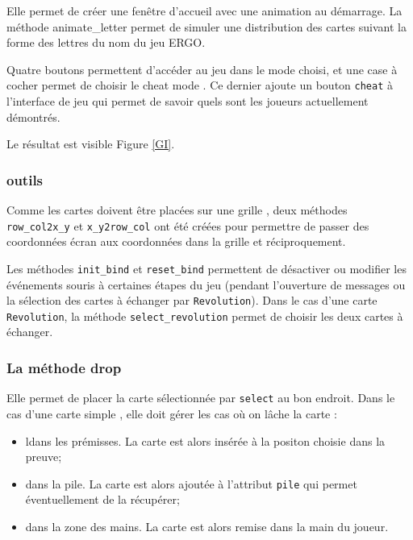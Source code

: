 \documentclass[12pt, a4paper]{article}
\begin{document}
Elle permet de créer une fenêtre d’accueil avec une animation au démarrage. La méthode animate\_letter permet de simuler une distribution des cartes suivant la forme des lettres du nom du jeu ERGO.

Quatre boutons permettent d'accéder au jeu dans le mode choisi, et une case à cocher permet de choisir le \og cheat mode \fg. Ce dernier ajoute un bouton \texttt{cheat} à l'interface de jeu qui permet de savoir quels sont les joueurs actuellement démontrés.

Le résultat est visible Figure \ref{GI}.

\subsubsection{outils}

Comme les cartes doivent être placées sur une \og grille \fg{},  deux méthodes \texttt{row\_col2x\_y} et \texttt{x\_y2row\_col} ont été créées pour permettre de passer des coordonnées écran aux coordonnées dans la grille et réciproquement.

Les méthodes \texttt{init\_bind} et \texttt{reset\_bind} permettent de désactiver ou modifier les événements souris à certaines étapes du jeu (pendant l'ouverture de messages ou la sélection des cartes à échanger par \texttt{Revolution}). Dans le cas d'une carte \texttt{Revolution}, la méthode \texttt{select\_revolution} permet de choisir les deux cartes à échanger.

\subsubsection{La méthode drop}

Elle permet de placer la carte sélectionnée par \texttt{select} au bon endroit. Dans le cas d'une carte \og simple \fg, elle doit gérer les cas où on lâche la carte :

\begin{itemize}
\item ldans les prémisses. La carte est alors insérée à la positon choisie dans la preuve;
\item dans la pile. La carte est alors ajoutée à l'attribut \texttt{pile} qui permet éventuellement de la récupérer;
\item dans la zone des mains. La carte est alors remise dans la main du joueur.
\end{itemize}
\end{document}
